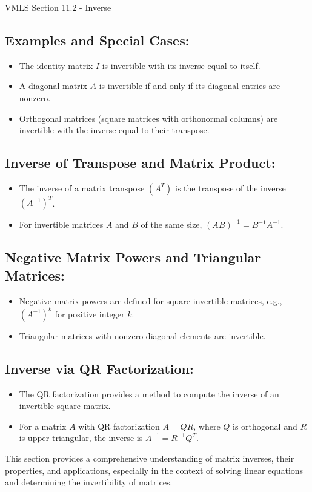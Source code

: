 \begin{notes}{VMLS Section 11.2 - Inverse}
    \subsection*{Examples and Special Cases:}
    \begin{itemize}
        \item The identity matrix $I$ is invertible with its inverse equal to itself.
        \item A diagonal matrix $A$ is invertible if and only if its diagonal entries are nonzero.
        \item Orthogonal matrices (square matrices with orthonormal columns) are invertible with the inverse equal to their transpose.
    \end{itemize}

    \subsection*{Inverse of Transpose and Matrix Product:}
    \begin{itemize}
        \item The inverse of a matrix transpose $(A^T)$ is the transpose of the inverse $(A^{-1})^T$.
        \item For invertible matrices $A$ and $B$ of the same size, $(AB)^{-1} = B^{-1}A^{-1}$.
    \end{itemize}

    \subsection*{Negative Matrix Powers and Triangular Matrices:}
    \begin{itemize}
        \item Negative matrix powers are defined for square invertible matrices, e.g., $(A^{-1})^k$ for positive integer $k$.
        \item Triangular matrices with nonzero diagonal elements are invertible.
    \end{itemize}

    \subsection*{Inverse via QR Factorization:}
    \begin{itemize}
        \item The QR factorization provides a method to compute the inverse of an invertible square matrix.
        \item For a matrix $A$ with QR factorization $A = QR$, where $Q$ is orthogonal and $R$ is upper triangular, the inverse is $A^{-1} = R^{-1}Q^T$.
    \end{itemize}

    This section provides a comprehensive understanding of matrix inverses, their properties, and applications, especially in the context of solving linear equations and determining the invertibility of matrices.
\end{notes}

